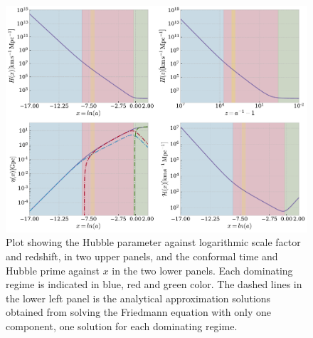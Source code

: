 \documentclass[10pt,a4paper]{article}
\begin{document}
\begin{figure}[ht]
    \centering
    \includegraphics[scale=0.5]{../figs/Hubble_eta_of_x.pdf}
    \caption{Plot showing the Hubble parameter against logarithmic scale factor and redshift, in two upper panels, and the conformal time and Hubble prime against $x$ in the two lower panels. Each dominating regime is indicated in blue, red and green color. The dashed lines in the lower left panel is the analytical approximation solutions obtained from solving the Friedmann equation with only one component, one solution for each dominating regime.}
    \label{fig:hubbe_and_eta}
\end{figure}
\end{document}
